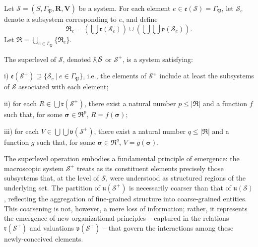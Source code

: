 \begin{definition} \label{def::superlevel_op}
Let $\mathcal{S} = (S, \Gamma_{\mathfrak{P}}, \mathbf{R}, \mathbf{V})$ be a system. For each element $e \in \mathfrak{e}(\mathcal{S}) = \Gamma_{\mathfrak{P}}$, let $\mathcal{S}_e$ denote a subsystem corresponding to $e$, and define
\[\mathfrak{R}_e = \left(\bigcup \mathfrak{r}(\mathcal{S}_e)\right) \cup \left(\bigcup \bigcup \mathfrak{v}(\mathcal{S}_e)\right).\]
Let $\mathfrak{R} = \bigcup_{e \in \Gamma_{\mathfrak{P}}} \{\mathfrak{R}_e\}$. 

The superlevel of $\mathcal{S}$, denoted $\hspace{-0.9pt}{\curlywedgeuparrow^{}}{\mathcal{S}}$ or $\mathcal{S}^+$, is a system satisfying:

\noindent
i) $\mathfrak{e}(\mathcal{S}^+) \supseteq \{\mathcal{S}_e \ | \ e \in \Gamma_{\mathfrak{P}}\}$, i.e., the elements of $\mathcal{S}^+$ include at least the subsystems of $\mathcal{S}$ associated with each element;

\noindent
ii) for each $R \in \bigcup \mathfrak{r}(\mathcal{S}^+)$, there exist a natural number $p \leq |\mathfrak{R}|$ and a function $f$ such that, for some $\boldsymbol{\sigma} \in \mathfrak{R}^p$, $R = f(\boldsymbol{\sigma})$;

\noindent
iii) for each $V \in \bigcup \bigcup \mathfrak{v}(\mathcal{S}^+)$, there exist a natural number $q \leq |\mathfrak{R}|$ and a function $g$ such that, for some $\boldsymbol{\sigma} \in \mathfrak{R}^q$, $V = g(\boldsymbol{\sigma})$.
\end{definition}

The superlevel operation embodies a fundamental principle of emergence: the macroscopic system $\mathcal{S}^+$ treats as its constituent elements precisely those subsystems that, at the level of $\mathcal{S}$, were understood as structured regions of the underlying set. The partition of $\mathfrak{u}(\mathcal{S}^+)$ is necessarily coarser than that of $\mathfrak{u}(\mathcal{S})$, reflecting the aggregation of fine-grained structure into coarse-grained entities. This coarsening is not, however, a mere loss of information; rather, it represents the emergence of new organizational principles -- captured in the relations $\mathfrak{r}(\mathcal{S}^+)$ and valuations $\mathfrak{v}(\mathcal{S}^+)$ -- that govern the interactions among these newly-conceived elements.

